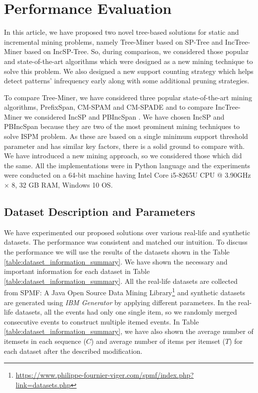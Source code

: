 \section{Performance Evaluation} \label{evaluation}
In this article, we have proposed two novel tree-based solutions for static and incremental mining problems, namely Tree-Miner based on SP-Tree and IncTree-Miner based on IncSP-Tree. So, during comparison, we considered those popular and state-of-the-art algorithms which were designed as a new mining technique to solve this problem. We also designed a new support counting strategy which helps detect patterns' infrequency early along with some additional pruning strategies.

To compare Tree-Miner, we have considered three popular state-of-the-art mining algorithms, PrefixSpan\cite{han2001prefixspan}, CM-SPAM and CM-SPADE\cite{fournier2014fast} and to compare IncTree-Miner we considered IncSP\cite{lin2004incremental} and PBIncSpan \cite{chen2007incremental}. We have chosen IncSP and PBIncSpan because they are two of the most prominent mining techniques to solve ISPM problem. As these are based on a single minimum support threshold parameter and has similar key factors, there is a solid ground to compare with. We have introduced a new mining approach, so we considered those which did the same. All the implementations were in Python language and the experiments were conducted on a 64-bit machine having Intel Core i5-8265U CPU @ 3.90GHz $\times$ 8, 32 GB RAM, Windows 10 OS.


\subsection{Dataset Description and Parameters}



We have experimented our proposed solutions over various real-life and synthetic datasets. The performance was consistent and matched our intuition.  To discuss the performance we will use the results of the datasets shown in the Table \ref{table:dataset_information_summary}. We have shown the necessary and important information for each dataset in Table \ref{table:dataset_information_summary}. All the real-life datasets are collected from SPMF: A Java Open Source Data Mining Library\footnote{\url{https://www.philippe-fournier-viger.com/spmf/index.php?link=datasets.php}} and synthetic datasets are generated using \textit{IBM Generator} by applying different parameters. In the real-life datasets, all the events had only one single item, so we randomly merged consecutive events to construct multiple itemed events. In Table \ref{table:dataset_information_summary}, we have also shown the average number of itemsets in each sequence ($C$) and average number of items per itemset ($T$) for each dataset after the described modification.


